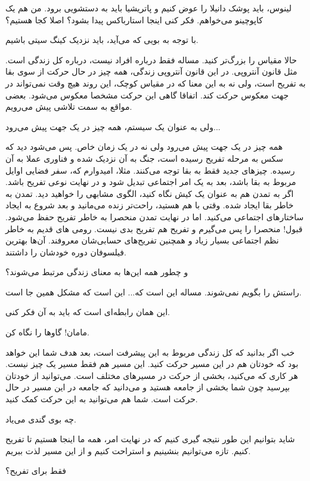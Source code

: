\begin{dialogue}
\tove
لینوس، باید پوشک دانیلا را عوض کنیم و پاتریشیا باید به
دستشویی برود. من هم یک کاپوچینو می‌خواهم. فکر کنی اینجا
استارباکس پیدا بشود؟ اصلا کجا
هستیم؟

با توجه به بویی که می‌آید، باید نزدیک کینگ
سیتی باشیم.

\linus
حالا مقیاس را بزرگ‌تر کنید. مساله فقط درباره افراد نیست،‌
درباره کل زندگی است. مثل قانون آنتروپی. در این قانون آنتروپی زندگی،
همه چیز در حال حرکت از سوی بقا به تفریح است، ولی نه به این معنا که در
مقیاس کوچک، این روند هیچ وقت نمی‌تواند در جهت معکوس حرکت کند. اتفاقا
گاهی این حرکت مشخصا معکوس می‌شود. بعضی مواقع به سمت تلاشی پیش می‌رویم.

\david
ولی به عنوان یک سیستم، همه چیز در یک جهت پیش می‌رود...

\linus
همه چیز در یک جهت پیش می‌رود ولی نه در یک زمان خاص. پس می‌شود
دید که سکس به مرحله تفریح رسیده است، جنگ به آن نزدیک شده و فناوری عملا
به آن رسیده. چیزهای جدید فقط به بقا توجه می‌کنند. مثلا، امیدوارم که،
سفر فضایی اوایل مربوط به بقا باشد، بعد به یک امر اجتماعی تبدیل شود و
در نهایت نوعی تفریح باشد. اگر به تمدن هم به عنوان یک کیش نگاه کنید،
الگوی مشابهی را خواهید دید. تمدن به خاطر بقا ایجاد شده. وقتی با هم
هستید، راحت‌تر زنده می‌مانید و بعد شروع به ایجاد ساختارهای اجتماعی
می‌کنید. اما در نهایت تمدن منحصرا به خاطر تفریح حفظ می‌شود. قبول! منحصرا
را پس می‌گیرم و تفریح هم تفریح بدی نیست. رومی های قدیم به خاطر نظم
اجتماعی بسیار زیاد و همچنین تفریح‌های حسابی‌شان معروفند. آن‌ها بهترین
فیلسوفان دوره خودشان را داشتند.

\david
و چطور همه این‌ها به معنای زندگی مرتبط می‌شوند؟

\linus
راستش را بگویم نمی‌شوند. مساله این است که... این است که مشکل
همین جا است.

\david
این همان رابطه‌ای است که باید به آن فکر کنی. 

\patricia
مامان! گاوها را نگاه کن.

\linus
خب اگر بدانید که کل زندگی مربوط به این پیشرفت است، بعد هدف
شما این خواهد بود که خودتان هم در این مسیر حرکت کنید. این مسیر هم فقط
مسیر یک چیز نیست. هر کاری که می‌کنید، بخشی از حرکت در مسیرهای مختلف
است. می‌توانید از خودتان بپرسید  چون شما
بخشی از جامعه هستید و می‌‌دانید که جامعه در این مسیر در حال حرکت
است. شما هم می‌توانید به این حرکت کمک کنید.

چه بوی گندی می‌یاد.

\linus
شاید بتوانیم این طور نتیجه گیری کنیم که در نهایت امر، همه
ما اینجا هستیم تا تفریح کنیم. تازه می‌توانیم بنشینیم و استراحت کنیم و
از این مسیر لذت ببریم.

\david
فقط برای تفریح؟
\end{dialogue}
